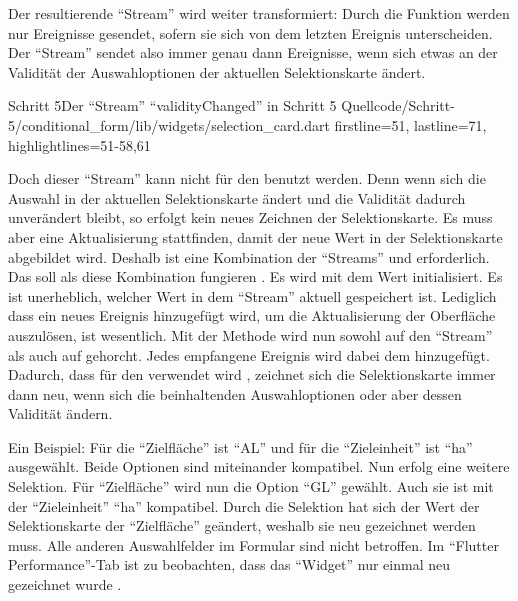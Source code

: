 Der resultierende \enquote{Stream} wird weiter transformiert: Durch die Funktion   werden nur Ereignisse gesendet,
sofern sie sich von dem letzten Ereignis unterscheiden.
Der \enquote{Stream}  sendet also immer genau dann Ereignisse,
wenn sich etwas an der Validität der Auswahloptionen der aktuellen Selektionskarte ändert.

\begin{alexlisting}{Schritt 5}{Der \enquote{Stream} \enquote{validityChanged} in Schritt 5}
  {Quellcode/Schritt-5/conditional_form/lib/widgets/selection_card.dart}
  {firstline=51, lastline=71, highlightlines={51-58,61}}
  \label{lst:Schritt5needsRepaint}
\end{alexlisting} 

Doch dieser \enquote{Stream} kann nicht für den  benutzt werden.
Denn wenn sich die Auswahl in der aktuellen Selektionskarte ändert
und die Validität dadurch unverändert bleibt,
so erfolgt kein neues Zeichnen der Selektionskarte.
Es muss aber eine Aktualisierung stattfinden, damit der neue Wert in der Selektionskarte abgebildet wird.
Deshalb ist eine Kombination der \enquote{Streams}  und  erforderlich.
Das   soll als diese Kombination fungieren .
Es wird mit dem Wert  initialisiert.
Es ist unerheblich, welcher Wert in dem \enquote{Stream} aktuell gespeichert ist.
Lediglich dass ein neues Ereignis hinzugefügt wird,
um die Aktualisierung der Oberfläche auszulösen,
ist wesentlich.
Mit der Methode  wird nun sowohl auf den \enquote{Stream}   als auch auf   gehorcht. 
Jedes empfangene Ereignis wird dabei dem   hinzugefügt.
Dadurch,
dass  für den  verwendet wird ,
zeichnet sich die Selektionskarte immer dann neu,
wenn sich die beinhaltenden Auswahloptionen oder aber dessen Validität ändern.


Ein Beispiel:
Für die \enquote{Zielfläche} ist \enquote{AL} und für die \enquote{Zieleinheit} ist \enquote{ha} ausgewählt.
Beide Optionen sind miteinander kompatibel.
Nun erfolg eine weitere Selektion.
Für \enquote{Zielfläche} wird nun die Option \enquote{GL} gewählt.
Auch sie ist mit der \enquote{Zieleinheit} \enquote{ha} kompatibel.
Durch die Selektion hat sich der Wert der Selektionskarte der \enquote{Zielfläche} geändert, weshalb sie neu gezeichnet werden muss.
Alle anderen Auswahlfelder im Formular sind nicht betroffen.
Im \enquote{Flutter Performance}-Tab ist zu beobachten,
dass das \enquote{Widget}  nur einmal neu gezeichnet wurde \Abb{\ref{fig:Schritt5_1rebuild}}.

